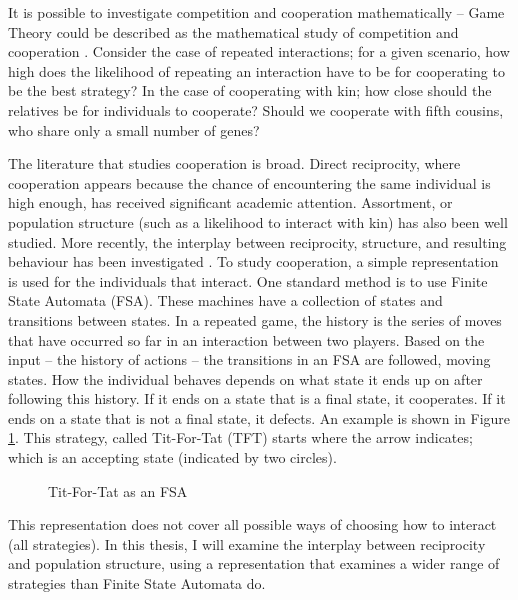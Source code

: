 \documentclass[a4paper,11pt,bcshonoursthesis,singlespace,oneside,thesisdraft,pdflatex]{cssethesis}
\begin{document}
It is possible to investigate competition and cooperation mathematically -- Game Theory could be described as the mathematical study of competition and cooperation \citep{binmore2007playing}. 
Consider the case of repeated interactions; for a given scenario, how high does the likelihood of repeating an interaction have to be for cooperating to be the best strategy? 
In the case of cooperating with kin; how close should the relatives be for individuals to cooperate? Should we cooperate with fifth cousins, who share only a small number of genes? 

The literature that studies cooperation is broad. Direct reciprocity, where cooperation appears because the chance of encountering the same individual is high enough, has received significant academic attention. 
Assortment, or population structure (such as a likelihood to interact with kin) has also been well studied. 
More recently, the interplay between reciprocity, structure, and resulting behaviour has been investigated \citep{van-veelen:PNAS:2012}. 
To study cooperation, a simple representation is used for the individuals that interact. One standard method is to use Finite State Automata (FSA). 
These machines have a collection of states and transitions between states. 
In a repeated game, the history is the series of moves that have occurred so far in an interaction between two players. 
Based on the input -- the history of actions -- the transitions in an FSA are followed, moving states. 
How the individual behaves depends on what state it ends up on after following this history. 
If it ends on a state that is a final state, it cooperates. If it ends on a state that is not a final state, it defects. An example is shown in Figure \ref{fig:fsa.tft.lang}. This strategy, called Tit-For-Tat (TFT) starts where the arrow indicates; which is an accepting state (indicated by two circles).

\begin{figure}
\center
{}
\caption{Tit-For-Tat as an FSA}
\label{fig:fsa.tft.lang}
\end{figure}

This representation does not cover all possible ways of choosing how to interact (all strategies). In this thesis, I will examine the interplay between reciprocity and population structure, using a representation that examines a wider range of strategies than Finite State Automata do. 
\end{document}
